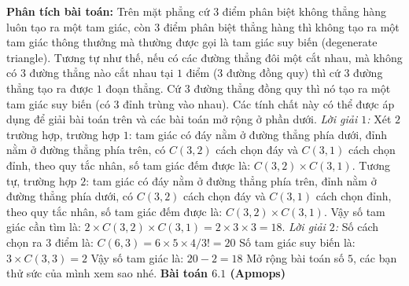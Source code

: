 \begin{multicols}{2}
\begin{figure}[H]
			\vspace*{-15pt}
		\end{figure}
	\vskip 0.1cm
	\textbf{\color{toancuabi}Phân tích bài toán:}
	\vskip 0.1cm
	Trên mặt phẳng cứ $3$ điểm phân biệt không thẳng hàng luôn tạo ra một tam giác, còn $3$ điểm phân biệt thẳng hàng thì không tạo ra một tam giác thông thưởng mà thường được gọi là tam giác suy biến (degenerate triangle). Tương tự như thế, nếu có các đường thẳng đôi một cắt nhau, mà không có $3$ đường thẳng nào cắt nhau tại $1$ điểm ($3$ đường đồng quy) thì cứ $3$ đường thẳng tạo ra được $1$ đoạn thẳng. Cứ $3$ đường thẳng đồng quy thì nó tạo ra một tam giác suy biến (có $3$ đỉnh trùng vào nhau). Các tính chất này có thể được áp dụng để giải bài toán trên và các bài toán mở rộng ở phần dưới.
	\vskip 0.1cm
	\textit{Lời giải $1$:}
	\vskip 0.1cm
	Xét $2$ trường hợp, trường hợp $1$: tam giác có đáy nằm ở đường thẳng phía dưới, đỉnh nằm ở đường thẳng phía trên, có $C(3,2)$ cách chọn đáy và $C(3,1)$ cách chọn đỉnh, theo quy tắc nhân, số tam giác đếm được là: $C(3,2)\times C(3,1)$. Tương tự, trường hợp $2$: tam giác có đáy nằm ở đường thẳng phía trên, đỉnh nằm ở đường thẳng phía dưới, có $C(3,2)$ cách chọn đáy và $C(3,1)$ cách chọn đỉnh, theo quy tắc nhân, số tam giác đếm được là: $C(3,2)\times C(3,1)$.
	\vskip 0.1cm
	Vậy số tam giác cần tìm là: $2\times C(3,2)\times C(3,1) = 2\times3\times3=18$.
	\vskip 0.1cm
	\textit{Lời giải $2$:}
	\vskip 0.1cm
	Số cách chọn ra $3$ điểm là: $C(6,3)=6\times 5\times4/3!=20$
	\vskip 0.1cm
	Số tam giác suy biến là: $3\times C(3,3)=2$
	\vskip 0.1cm
	Vậy số tam giác là: $20-2=18$
	\vskip 0.1cm
	Mở rộng bài toán số $5$, các bạn thử sức của mình xem sao nhé.
	\vskip 0.1cm
		\textbf{\color{toancuabi}Bài toán $\pmb{6.1}$ (Apmops)}

\end{multicols}
